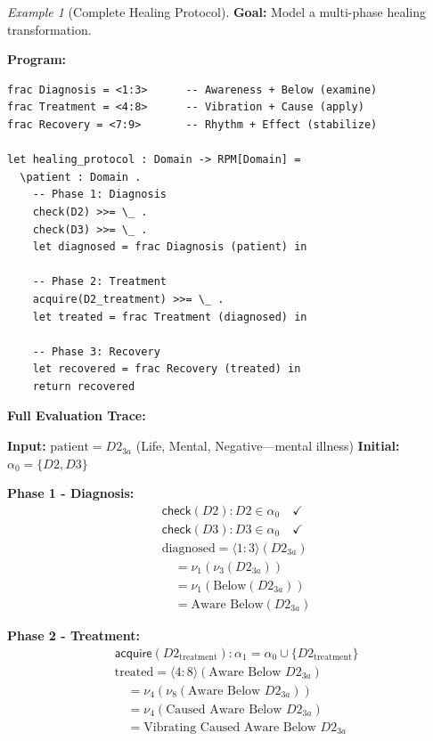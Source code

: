 \documentclass[11pt,twoside,openright]{book}
\theoremstyle{definition}
\theoremstyle{plain}
\theoremstyle{remark}
\newtheorem{example}[definition]{Example}
\newcommand{\noe}[1]{\nu_{#1}}
\begin{document}
\begin{example}[Complete Healing Protocol]
\label{ex:healing-protocol}
\textbf{Goal:} Model a multi-phase healing transformation.

\textbf{Program:}
\begin{verbatim}
frac Diagnosis = <1:3>      -- Awareness + Below (examine)
frac Treatment = <4:8>      -- Vibration + Cause (apply)
frac Recovery = <7:9>       -- Rhythm + Effect (stabilize)

let healing_protocol : Domain -> RPM[Domain] =
  \patient : Domain .
    -- Phase 1: Diagnosis
    check(D2) >>= \_ .
    check(D3) >>= \_ .
    let diagnosed = frac Diagnosis (patient) in

    -- Phase 2: Treatment
    acquire(D2_treatment) >>= \_ .
    let treated = frac Treatment (diagnosed) in

    -- Phase 3: Recovery
    let recovered = frac Recovery (treated) in
    return recovered
\end{verbatim}

\textbf{Full Evaluation Trace:}

\textbf{Input:} $\text{patient} = D2_{3a}$ (Life, Mental, Negative---mental illness)
\textbf{Initial:} $\alpha_0 = \{D2, D3\}$

\textbf{Phase 1 - Diagnosis:}
\begin{align}
&\mathsf{check}(D2): D2 \in \alpha_0 \quad \checkmark \\
&\mathsf{check}(D3): D3 \in \alpha_0 \quad \checkmark \\
&\text{diagnosed} = \langle 1:3 \rangle(D2_{3a}) \\
&\quad = \noe{1}(\noe{3}(D2_{3a})) \\
&\quad = \noe{1}(\text{Below}(D2_{3a})) \\
&\quad = \text{Aware Below}(D2_{3a})
\end{align}

\textbf{Phase 2 - Treatment:}
\begin{align}
&\mathsf{acquire}(D2_{\text{treatment}}): \alpha_1 = \alpha_0 \cup \{D2_{\text{treatment}}\} \\
&\text{treated} = \langle 4:8 \rangle(\text{Aware Below } D2_{3a}) \\
&\quad = \noe{4}(\noe{8}(\text{Aware Below } D2_{3a})) \\
&\quad = \noe{4}(\text{Caused Aware Below } D2_{3a}) \\
&\quad = \text{Vibrating Caused Aware Below } D2_{3a}
\end{align}


\end{example}
\end{document}
